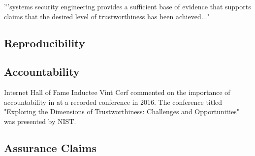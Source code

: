\documentclass[../../main/main.tex]{subfiles}
\begin{document}
'''systems security engineering provides a sufficient base of evidence that supports claims that the desired level of trustworthiness has been achieved..."


\subsection{Reproducibility}\label{ssec:reproducibility}
\subsection{Accountability}\label{ssec:accountability}
Internet Hall of Fame Inductee Vint Cerf commented on the importance of accountability in  at a recorded conference in 2016.  The conference titled "Exploring the Dimensions of Trustworthiness: Challenges and Opportunities" was presented by NIST.  

\subsection{Assurance Claims}\label{ssec:assurance}
\end{document}
